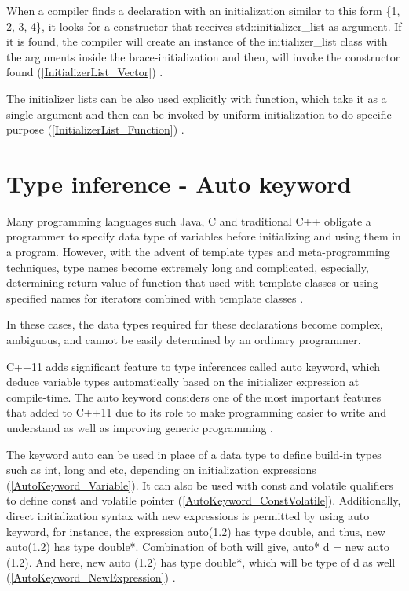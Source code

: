 \documentclass[11pt]{report}
\begin{document}
When a compiler finds a declaration with an initialization similar to this form \{1, 2, 3, 4\}, it looks for a constructor that receives std::initializer\_list as argument. If it is found, the compiler will create an instance of the initializer\_list class with the arguments inside the brace-initialization and then, will invoke the constructor found (\ref{InitializerList_Vector}) \cite{Reddy:2011:API}. 


The initializer lists can be also used explicitly with function, which take it as a single argument and then can be invoked by uniform initialization to do specific purpose (\ref{InitializerList_Function}) \cite{Reddy:2011:API}.


\section{Type inference - Auto keyword}
\label{section: Auto keyword}
Many programming languages such Java, C and traditional C++ obligate a programmer to specify data type of variables before initializing and using them in a program. However, with the advent of template types and meta-programming techniques, type names become extremely long and complicated, especially, determining return value of function that used with template classes or using specified names for iterators combined with template classes \cite{Horstmann:2008:BC}.


In these cases, the data types required for these declarations become complex, ambiguous, and cannot be easily determined by an ordinary programmer.


C++11 adds significant feature to type inferences called auto keyword, which deduce variable types automatically based on the initializer expression at compile-time.  The auto keyword considers one of the most important features that added to C++11 due to its role to make programming easier to write and understand as well as improving generic programming \cite{Gregorie:professionalcpp}.


The keyword auto can be used in place of a data type to define build-in types such as int, long and etc, depending on initialization expressions (\ref{AutoKeyword_Variable}). It can also be used with const and volatile qualifiers to define const and volatile pointer (\ref{AutoKeyword_ConstVolatile}). Additionally, direct initialization syntax with new expressions is permitted by using auto keyword, for instance, the expression auto(1.2) has type double, and thus, new auto(1.2) has type double*. Combination of both will give, auto* d = new auto (1.2). And here, new auto (1.2) has type double*, which will be type of d as well (\ref{AutoKeyword_NewExpression}) \cite{Stroustrup:2012:Cpp11}.
\end{document}
